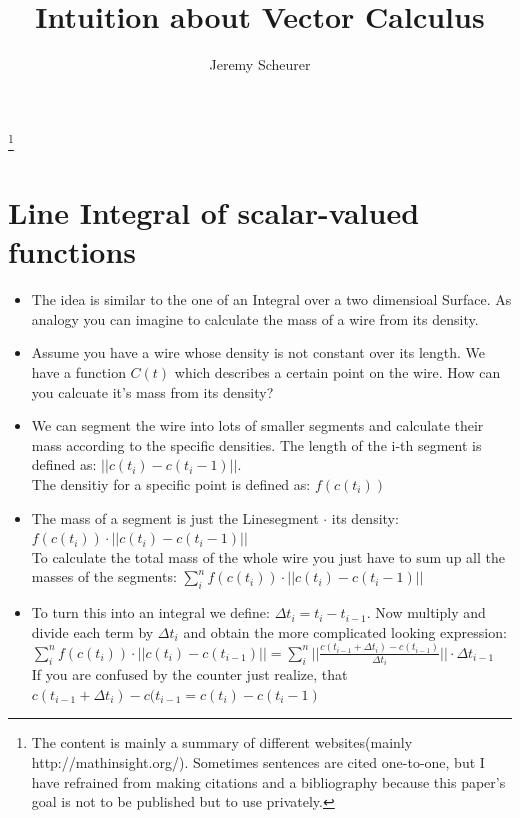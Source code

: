 \documentclass[12pt,a4paper]{article}
\author{Jeremy Scheurer}
\title{Intuition about Vector Calculus}
\begin{document}
	\maketitle
	\tableofcontents
	\let\thefootnote\relax\footnote{The content is mainly a summary of different websites(mainly http://mathinsight.org/). Sometimes sentences are cited one-to-one, but I have refrained from making citations and a bibliography because this paper's goal is not to be published but to use privately.}
	\newpage
	\section{Line Integral of scalar-valued functions}
	
	\begin{itemize}
	
	\item The idea is similar to the one of an Integral over a two dimensioal Surface. As analogy you can imagine to calculate the mass of a wire from its density. 
	
	\item Assume you have a wire whose density is not constant over its length. We have a function $C(t)$ which describes a certain point on the wire. How can you calcuate it's mass from its density?
	
	\item We can segment the wire into lots of smaller segments and calculate their mass according to the specific densities. The length of the i-th segment is defined as: $||c(t_i) - c(t_i -1)||$. \\
	The densitiy for a specific point is defined as: $f(c(t_i))$
	
	\item The mass of a segment is just the Linesegment $\cdot$ its density: \\
	$f(c(t_i))\cdot||c(t_i) - c(t_i -1)||$ \\
	To calculate the total mass of the whole wire you just have to sum up all the masses of the segments: $\sum_{i}^{n} f(c(t_i))\cdot||c(t_i) - c(t_i -1)||$
	
	\item To turn this into an integral we define: $ \Delta t_i = t_i - t_{i-1}$. Now multiply and divide each term by $\Delta t_i$ and obtain the more complicated looking expression: \\
	$\sum_{i}^{n} f(c(t_i))\cdot ||c(t_i)-c(t_{i-1})|| = \sum_{i}^{n}     ||\frac{c(t_{i-1} + \Delta t_i)-c(t_{i-1})}{\Delta t_i}|| \cdot \Delta t_{i-1}$\\
	If you are confused by the counter just realize, that $c(t_{i-1} + \Delta t_i)-c(t_{i-1} = c(t_i) - c(t_i -1)$
	

\end{itemize}
\end{document}
